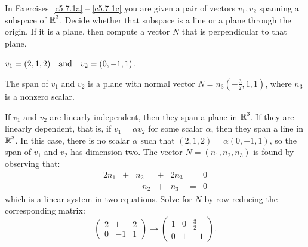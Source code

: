 \documentclass{ximera}
\begin{document}
\noindent In Exercises~\ref{c5.7.1a} -- \ref{c5.7.1c} you are
given a pair of vectors $v_1,v_2$ spanning a subspace of $\mbox{$\Bbb{R}$}^3$.
Decide whether that subspace is a line or a plane through the
origin.  If it is a plane, then compute a vector $N$ that is
perpendicular to that plane.
\begin{exercise} \label{c5.7.1a}
$v_1=(2,1,2) \quad\mbox{and}\quad v_2=(0,-1,1)$.

\begin{solution}

\ans The span of $v_1$ and $v_2$ is a plane with normal vector
$N = n_3(-\frac{3}{2}, 1, 1)$, where $n_3$ is a nonzero scalar.

\soln If $v_1$ and $v_2$ are linearly independent, then they span a plane
in $\mbox{$\Bbb{R}$}^3$.  If they are linearly dependent, that is, if $v_1 =
\alpha v_2$ for some scalar $\alpha$, then they span a line in $\mbox{$\Bbb{R}$}^3$.
In this case, there is no scalar $\alpha$ such that $(2,1,2) =
\alpha(0,-1,1)$, so the span of $v_1$ and $v_2$ has dimension two.
The vector $N = (n_1,n_2,n_3)$ is found by observing that:
\[
\begin{array}{rrrrrcl}
2n_1 & + & n_2 & + & 2n_3 & = & 0 \\
& & -n_2 & + & n_3 & = & 0 \end{array}
\]
which is a linear system in two equations.  Solve for $N$ by row
reducing the corresponding matrix:
\[
\left(\begin{array}{rrr} 2 & 1 & 2 \\ 0 & -1 & 1 \end{array}\right)
\longrightarrow \left(\begin{array}{rrr} 1 & 0 & \frac{3}{2} \\ 0 &
1 & -1 \end{array}\right).
\]

\end{solution}
\end{exercise}
\end{document}

